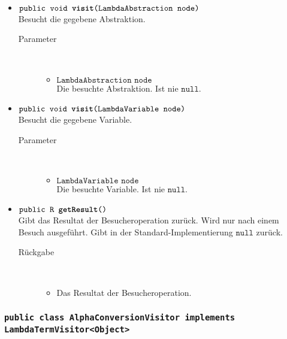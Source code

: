 \begin{description}
\begin{itemize}
		\item $\texttt{public void \textbf{visit}(LambdaAbstraction node)}$ \\ Besucht die gegebene Abstraktion.
		\begin{description}
			\item[Parameter] \hfill \\
			\vspace{-.8cm}
			\begin{itemize}
				\item $\texttt{LambdaAbstraction node}$ \\ Die besuchte Abstraktion. Ist nie $\texttt{null}$.
			\end{itemize}
		\end{description}
		
		\item $\texttt{public void \textbf{visit}(LambdaVariable node)}$ \\ Besucht die gegebene Variable.
		\begin{description}
			\item[Parameter] \hfill \\
			\vspace{-.8cm}
			\begin{itemize}
				\item $\texttt{LambdaVariable node}$ \\ Die besuchte Variable. Ist nie $\texttt{null}$.
			\end{itemize}
		\end{description}
		
		\item $\texttt{public R \textbf{getResult}()}$ \\ Gibt das Resultat der Besucheroperation zurück. Wird nur nach einem Besuch ausgeführt. Gibt in der Standard-Implementierung $\texttt{null}$ zurück.
		\begin{description}
			\item[Rückgabe] \hfill \\
			\vspace{-.8cm}
			\begin{itemize}
				\item Das Resultat der Besucheroperation.
			\end{itemize}
		\end{description}
	\end{itemize}
\end{description}

\subsubsection{\normalfont \texttt{public class \textbf{AlphaConversionVisitor} implements LambdaTermVisitor<Object>}}

